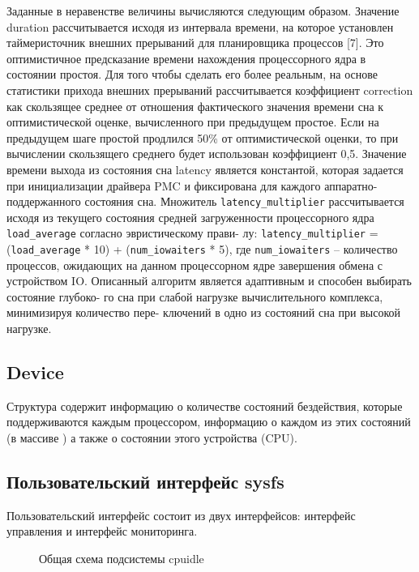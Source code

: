 \documentclass{article}
\begin{document}
Заданные в неравенстве величины вычисляются следующим образом. Значение
duration рассчитывается исходя из интервала времени, на которое установлен таймеристочник внешних прерываний для планировщика процессов [7]. Это оптимистичное
предсказание времени нахождения процессорного ядра в состоянии простоя. Для того
чтобы сделать его более реальным, на основе статистики прихода внешних прерываний
рассчитывается коэффициент correction как скользящее среднее от отношения фактического значения времени сна к оптимистической оценке, вычисленного при предыдущем
простое. Если на предыдущем шаге простой продлился 50\% от оптимистической оценки,
то при вычислении скользящего среднего будет использован коэффициент 0,5. Значение
времени выхода из состояния сна latency является константой, которая задается при инициализации драйвера PMC и фиксирована для каждого аппаратно-поддержанного состояния сна. Множитель \texttt{latency\_multiplier} рассчитывается исходя из текущего состояния
средней загруженности процессорного ядра \texttt{load\_average} согласно эвристическому прави-
лу:
\texttt{latency\_multiplier} = (\texttt{load\_average} * 10) + (\texttt{num\_iowaiters} * 5),
где \texttt{num\_iowaiters} – количество процессов, ожидающих на данном процессорном ядре завершения обмена с устройством IO.
Описанный алгоритм является адаптивным и способен выбирать состояние глубоко-
го сна при слабой нагрузке вычислительного комплекса, минимизируя количество пере-
ключений в одно из состояний сна при высокой нагрузке.

\subsection{Device}
Структура содержит информацию о количестве состояний бездействия, которые поддерживаются каждым процессором, информацию о каждом из этих состояний (в массиве ) а также о состоянии этого устройства (CPU).


\subsection{Пользовательский интерфейс sysfs}

Пользовательский интерфейс состоит из двух интерфейсов: интерфейс управления и интерфейс мониторинга.

\begin{figure}[h]
\caption{Общая схема подсистемы cpuidle}
\end{figure}
\end{document}
